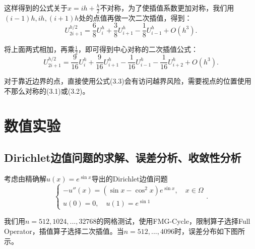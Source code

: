 \documentclass[lang=cn,10pt]{elegantbook}
\begin{document}
这样得到的公式关于$x=ih+\frac{h}{2}$不对称，为了使插值系数更加对称，我们用$(i-1)h,ih,(i+1)h$处的点值再做一次二次插值，得到：
\begin{equation}
  U^{h/2}_{2i+1} = \frac{6}{8}U^h_{i} + \frac{3}{8}U^h_{i+1} - \frac{1}{8}U^h_{i-1} + O(h^3).
\end{equation}

将上面两式相加，再乘$\frac{1}{2}$，即可得到中心对称的二次插值公式：
\begin{equation}
  U^{h/2}_{2i+1} = \frac{9}{16}U^h_{i} + \frac{9}{16}U^h_{i+1} - \frac{1}{16}U^h_{i-1} - \frac{1}{16}U^h_{i+2} + O(h^3).
\end{equation}

对于靠近边界的点，直接使用公式(3.3)会有访问越界风险，需要视点的位置使用不那么对称的(3.1)或(3.2)。

\section{数值实验}

\subsection{Dirichlet边值问题的求解、误差分析、收敛性分析}

考虑由精确解$u(x)=e^{\sin x}$导出的Dirichlet边值问题
\begin{equation}
  \left\{
    \begin{array}{l}
      -u''(x) = (\sin x-\cos^2 x)e^{\sin x},\quad x\in\Omega \\
      u(0)=0,\quad u(1)=e^{\sin 1}
    \end{array}
  \right. .
\end{equation}

我们用$n=512,1024,...,32768$的网格测试，使用FMG-Cycle，限制算子选择Full Operator，插值算子选择二次插值。当$n=512,...,4096$时，误差分布如下图所示。
\end{document}
